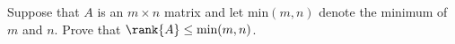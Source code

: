 Suppose that $A$ is an $m\times n$ matrix and let $\text{min}(m,n)$ denote the minimum of $m$ and $n$.  Prove that $\rank{A}\leq \text{min}(m,n)$.